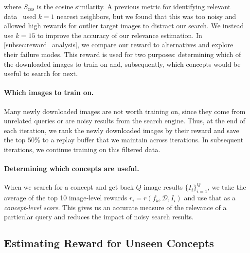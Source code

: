 where $S_{\cos}$ is the cosine similarity. A previous metric for identifying relevant data~\cite{jiang2021improving} used $k=1$ nearest neighbors, 
but we found that this was too noisy and allowed high rewards for outlier target images to distract our search.
We instead use $k=15$ to improve the accuracy of our relevance estimation.
In \cref{subsec:reward_analysis}, we compare our reward to alternatives and explore their failure modes. This reward is used for two purposes: determining which of the downloaded images to train on and, subsequently, which concepts would be useful to search for next.

\vspace{-0.06in}
\paragraph{Which images to train on.}
Many newly downloaded images are not worth training on, since they come from unrelated queries or are noisy results from the search engine.
Thus, at the end of each iteration, we rank the newly downloaded images by their reward and save the top $50\%$ to a replay buffer that we maintain across iterations. In subsequent iterations, we continue training on this filtered data.

\vspace{-0.06in}
\paragraph{Determining which concepts are useful.}
When we search for a concept and get back $Q$ image results $\{ I_i \}_{i=1}^Q$, we take the average of the top 10 image-level rewards $r_i = r(f_k, \mathcal D, I_i)$ and use that as a \textit{concept-level score}. This gives us an accurate measure of the relevance of a particular query and reduces the impact of noisy search results. 



\subsection{Estimating Reward for Unseen Concepts}
\label{subsec:unseen_reward}

